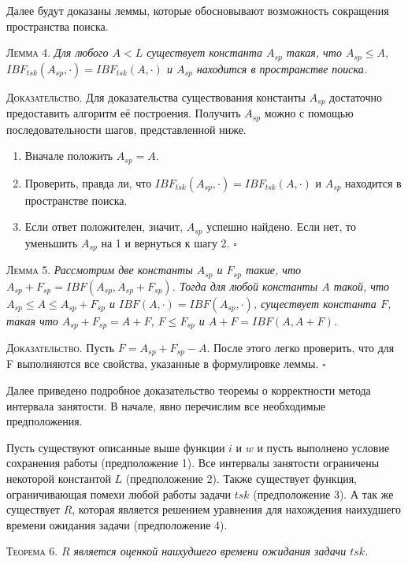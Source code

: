 \documentclass[14pt]{matmex-diploma-custom}
\begin{document}
Далее будут доказаны леммы, которые обосновывают возможность сокращения пространства поиска.

\textsc{Лемма 4.}
\textit{Для любого $A < L $ существует константа $A_{sp}$ такая, что $ A_{sp} \leq A$, $IBF_{tsk}(A_{sp}, \cdot) = IBF_{tsk}(A, \cdot)$ и $A_{sp}$ находится в пространстве поиска.}

\textsc{Доказательство.} Для доказательства существования константы $A_{sp}$ достаточно предоставить алгоритм её построения. Получить $A_{sp}$ можно с помощью последовательности шагов, представленной ниже.
    \begin{enumerate} 
        \item Вначале положить $A_{sp} = A$. 
        \item Проверить, правда ли, что $IBF_{tsk}(A_{sp}, \cdot) = IBF_{tsk}(A, \cdot)$ и $A_{sp}$ находится в пространстве поиска.
        \item Если ответ положителен, значит, $A_{sp}$ успешно найдено. Если нет, то уменьшить $A_{sp}$ на 1 и вернуться к шагу 2. $\square$
    \end{enumerate} 


\textsc{Лемма 5.} 
\textit{Рассмотрим две константы $A_{sp}$ и $F_{sp}$ такие, что $A_{sp} + F_{sp} = IBF(A_{sp}, A_{sp} + F_{sp})$. Тогда для любой константы $A$ такой, что $A_{sp} \leq A \leq A_{sp} + F_{sp}$ и $IBF(A, \cdot) = IBF(A_{sp},\cdot)$, существует константа $F$, такая что $A_{sp} + F_{sp} = A + F$, $F \leq F_{sp}$ и $A + F = IBF(A, A + F)$.}
 
\textsc{Доказательство.} Пусть $F = A_{sp} + F_{sp} - A$. После этого легко проверить, что для F выполняются все свойства, указанные в формулировке леммы. $\square$


Далее приведено подробное доказательство теоремы о корректности метода интервала занятости.
  В начале, явно перечислим все необходимые предположения.

Пусть существуют описанные выше функции $i$ и $w$ и пусть выполнено условие сохранения работы (предположение 1). 
  Все интервалы занятости ограничены некоторой константой $L$ (предположение 2). 
  Также существует функция, ограничивающая помехи любой работы задачи $tsk$ (предположение 3). 
  А так же существует $R$, которая является решением уравнения для нахождения наихудшего 
  времени ожидания задачи (предположение 4).

\textsc{Теорема 6.}
\textit{$R$ является оценкой наихудшего времени ожидания задачи $tsk$. }
\end{document}
